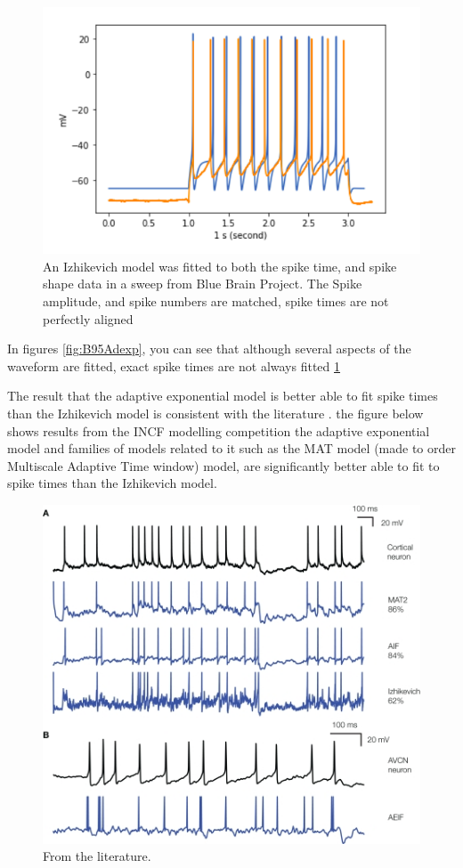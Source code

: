 \begin{figure}
    \centering
    \includegraphics{figures/IZHI_B95.png}
    \caption{An Izhikevich model was fitted to both the spike time, and spike shape data in a sweep from Blue Brain Project. The Spike amplitude, and spike numbers are matched, spike times are not perfectly aligned}
    \label{fig:B95_IZHI}
\end{figure}

In figures \ref{fig:B95Adexp}, you can see that although several aspects of the waveform are fitted, exact spike times are not always fitted \ref{fig:B95_IZHI}

The result that the adaptive exponential model is better able to fit spike times than the Izhikevich model is consistent with the literature \cite{rossant2011fitting}. the figure below shows results from the INCF modelling competition the adaptive exponential model and families of models related to it such as the MAT model (made to order Multiscale Adaptive Time window) model, are significantly better able to fit to spike times than the Izhikevich model.



\begin{figure}
    \centering
    \includegraphics{figures/IZHIkevich_fit_60Adexp_80.jpg}
    \caption{
    From the literature.
    \cite{rossant2011fitting}
    }
    \label{fig:my_label}
\end{figure}